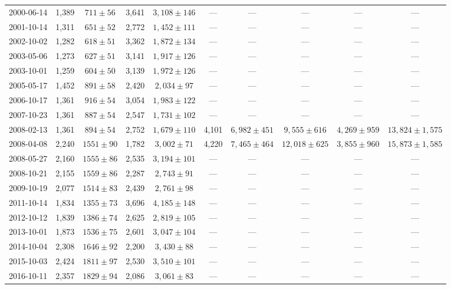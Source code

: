 \begin{landscape}
\begin{longtable}{cccccccccc}
{2000-06-14} & 1,389 & {$711  \pm  56$} & 3,641 & {$3,108 \pm 146$} & --- & --- & --- & --- & --- \\
{2001-10-14} & 1,311 & {$651  \pm  52$} & 2,772 & {$1,452 \pm 111$} & --- & --- & --- & --- & --- \\
{2002-10-02} & 1,282 & {$618  \pm  51$} & 3,362 & {$1,872 \pm 134$} & --- & --- & --- & --- & --- \\
{2003-05-06} & 1,273 & {$627  \pm  51$} & 3,141 & {$1,917 \pm 126$} & --- & --- & --- & --- & --- \\
{2003-10-01} & 1,259 & {$604  \pm  50$} & 3,139 & {$1,972 \pm 126$} & --- & --- & --- & --- & --- \\
{2005-05-17} & 1,452 & {$891  \pm  58$} & 2,420 & {$2,034 \pm 97$} & --- & --- & --- & --- & --- \\
{2006-10-17} & 1,361 & {$916  \pm  54$} & 3,054 & {$1,983 \pm 122$} & --- & --- & --- & --- & --- \\
{2007-10-23} & 1,361 & {$887  \pm  54$} & 2,547 & {$1,731 \pm 102$} & --- & --- & --- & --- & --- \\
{2008-02-13} & 1,361 & {$894  \pm  54$} & 2,752 & {$1,679 \pm 110$} & 4,101 & {$6,982 \pm 451$} & {$9,555 \pm 616$} & {$4,269 \pm 959$} & {$13,824 \pm 1,575$} \\
{2008-04-08} & 2,240 & {$1551  \pm  90$} & 1,782 & {$3,002 \pm 71$} & 4,220 & {$7,465 \pm 464$} & {$12,018 \pm 625$} & {$3,855 \pm 960$} & {$15,873 \pm 1,585$} \\
{2008-05-27} & 2,160 & {$1555  \pm  86$} & 2,535 & {$3,194 \pm 101$} & --- & --- & --- & --- & --- \\
{2008-10-21} & 2,155 & {$1559  \pm  86$} & 2,287 & {$2,743 \pm 91$} & --- & --- & --- & --- & --- \\
{2009-10-19} & 2,077 & {$1514  \pm  83$} & 2,439 & {$2,761 \pm 98$} & --- & --- & --- & --- & --- \\
{2011-10-14} & 1,834 & {$1355  \pm  73$} & 3,696 & {$4,185 \pm 148$} & --- & --- & --- & --- & --- \\
{2012-10-12} & 1,839 & {$1386  \pm  74$} & 2,625 & {$2,819 \pm 105$} & --- & --- & --- & --- & --- \\
{2013-10-01} & 1,873 & {$1536  \pm  75$} & 2,601 & {$3,047 \pm 104$} & --- & --- & --- & --- & --- \\
{2014-10-04} & 2,308 & {$1646  \pm  92$} & 2,200 & {$3,430 \pm 88$} & --- & --- & --- & --- & --- \\
{2015-10-03} & 2,424 & {$1811  \pm  97$} & 2,530 & {$3,510 \pm 101$} & --- & --- & --- & --- & --- \\
{2016-10-11} & 2,357 & {$1829  \pm  94$} & 2,086 & {$3,061 \pm 83$} & --- & --- & --- & --- & --- \\
\end{longtable} 
\end{landscape} 
